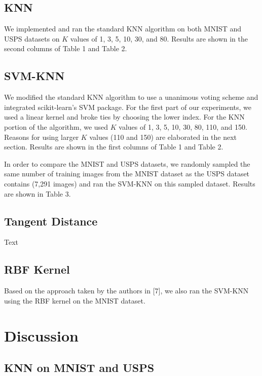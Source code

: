 \documentclass[11pt,letterpaper]{article}
\begin{document}
\subsection{KNN}

We implemented and ran the standard KNN algorithm on both MNIST and USPS datasets on $K$ values of 1, 3, 5, 10, 30, and 80. Results are shown in the second columns of Table 1 and Table 2.

\subsection{SVM-KNN}

We modified the standard KNN algorithm to use a unanimous voting scheme and integrated scikit-learn's SVM package. For the first part of our experiments, we used a linear kernel and broke ties by choosing the lower index. For the KNN portion of the algorithm, we used $K$ values of 1, 3, 5, 10, 30, 80, 110, and 150. Reasons for using larger $K$ values (110 and 150) are elaborated in the next section. Results are shown in the first columns of Table 1 and Table 2.

In order to compare the MNIST and USPS datasets, we randomly sampled the same number of training images from the MNIST dataset as the USPS dataset contains (7,291 images) and ran the SVM-KNN on this sampled dataset. Results are shown in Table 3.



\subsection{Tangent Distance}

Text

\subsection{RBF Kernel}

Based on the approach taken by the authors in [7], we also ran the SVM-KNN using the RBF kernel on the MNIST dataset.

\section{Discussion}

\subsection{KNN on MNIST and USPS}
\end{document}
